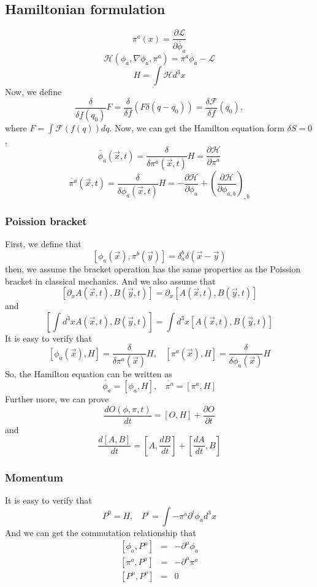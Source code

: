 \documentclass{article}
\begin{document}
\subsection{Hamiltonian formulation}
\[\pi^a(x) = \frac{\partial \mathcal{L}}{\partial \dot{\phi_a}}\]
\[\mathcal{H}(\phi_a,\nabla \phi_a,\pi^a) = \pi^a \dot{\phi_a} - \mathcal{L}\]
\[H = \int \mathcal{H} d^3 x\]
Now, we define
\[\frac{\delta}{\delta f(q_0)} F = \frac{\delta}{\delta f} (F \delta(q-q_0)) = \frac{\delta \mathcal{F}}{\delta f}(q_0),\]where $ F = \int \mathcal{F}(f(q)) dq$.
Now, we can get the Hamilton equation form $\delta S =0$,
\[\dot{\phi_a}(\vec{x},t) = \frac{\delta}{\delta \pi^a(\vec{x},t)} H = \frac{\partial \mathcal{H}}{\partial \pi^a}\]
\[\dot{\pi^a}(\vec{x},t) = \frac{\delta}{\delta \phi_a(\vec{x},t)} H = - \frac{\partial \mathcal{H}}{\partial \phi_a} + \left(\frac{\partial \mathcal{H}}{\partial \phi_{a,b}}\right)_{,b}\]

\subsubsection{Poission bracket}
First, we define that
\[[\phi_a(\vec{x}),\pi^b(\vec{y})] = \delta^{b}_{a} \delta(\vec{x}-\vec{y})\]
then, we assume the bracket operation has the same properties as the Poission bracket in classical mechanics. And we also assume that
\[[\partial_x A(\vec{x},t),B(\vec{y},t)] = \partial_x [A(\vec{x},t),B(\vec{y},t)]\]
and
\[[\int d^3 x A(\vec{x},t),B(\vec{y},t)] = \int d^3 x [A(\vec{x},t),B(\vec{y},t)]\]
It is easy to verify that
\[[\phi_a(\vec{x}),H] = \frac{\delta }{\delta \pi^a(\vec{x})} H, \ \ \ \ [\pi^a(\vec{x}),H] = \frac{\delta }{\delta \phi_a(\vec{x})} H\]
So, the Hamilton equation can be written as
\[\dot{\phi_a} = [\phi_a,H], \ \ \ \ \dot{\pi^a} = [\pi^a,H]\]
Further more, we can prove
\[\frac{dO(\phi,\pi,t)}{dt} = [O,H] + \frac{\partial O}{\partial t}\]
and
\[\frac{d[A,B]}{dt} = [A,\frac{dB}{dt}] + [\frac{dA}{dt},B]  \]
\subsubsection{Momentum}
It is easy to verify that
\[P^{0} = H, \ \ \ \ P^{i} = \int -\pi^a \partial^i \phi_a d^3 x\]
And we can get the commutation relationship that
\begin{eqnarray}
\left[\phi_a,P^{\mu}\right] &=& -\partial^{\mu} \phi_a \nonumber \\
\left[\pi^a,P^{\mu}\right] &=& -\partial^{\mu} \pi^a \nonumber \\
\left[P^{\mu},P^{\nu}\right] &=& 0 \nonumber 
\end{eqnarray}
\end{document}
